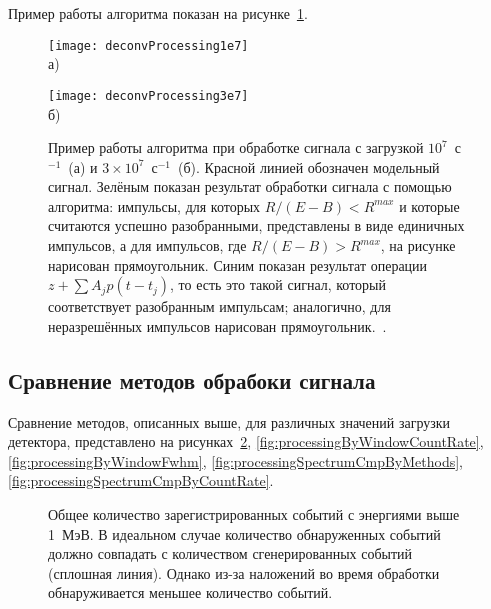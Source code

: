 Пример работы алгоритма показан на рисунке~\ref{fig:DeconvProcessing}.

\begin{figure}[ht]
    \begin{minipage}[b][][b]{0.95\linewidth}\centering
        \texttt{[image: deconvProcessing1e7]} \\ а)
    \end{minipage}
    \vfill
    \begin{minipage}[b][][b]{0.95\linewidth}\centering
        \texttt{[image: deconvProcessing3e7]} \\ б)
    \end{minipage}
    \vspace{5mm}
    \caption{ Пример работы алгоритма при обработке сигнала с загрузкой $10^7$~с${}^{-1}$~(а) и $3 \times 10^7$~с${}^{-1}$~(б). Красной линией обозначен модельный сигнал. Зелёным показан результат обработки сигнала с помощью алгоритма: импульсы, для которых $R/(E-B)<R^{max}$ и которые считаются успешно разобранными, представлены в виде единичных импульсов, а для импульсов, где $R/(E-B)>R^{max}$, на рисунке нарисован прямоугольник. Синим показан результат операции $z + \sum A_j p(t - t_j)$, то есть это такой сигнал, который соответствует разобранным импульсам; аналогично, для неразрешённых импульсов нарисован прямоугольник.~\cite{Khilkevitch2020}. }
    \label{fig:DeconvProcessing}
\end{figure}


\subsection{Сравнение методов обрабоки сигнала}

Сравнение методов, описанных выше, для различных значений загрузки детектора, представлено на рисунках~\ref{fig:processingTotalCountRate},  \ref{fig:processingByWindowCountRate}, \ref{fig:processingByWindowFwhm}, \ref{fig:processingSpectrumCmpByMethods}, \ref{fig:processingSpectrumCmpByCountRate}. 

\begin{figure}[ht!]
  \caption{Общее количество зарегистрированных событий с энергиями выше 1~МэВ. В идеальном случае количество обнаруженных событий должно совпадать с количеством сгенерированных событий (сплошная линия). Однако из-за наложений во время обработки обнаруживается меньшее количество событий.~\cite{Khilkevitch2020} }
  \label{fig:processingTotalCountRate}
\end{figure}

